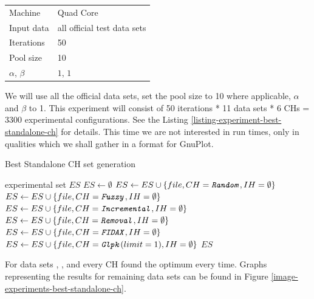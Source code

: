 \begin{center}
\bigskip
\begin{tabular}{| l | l |}
  \hline
  \hline
  Machine           & Quad Core \\
  Input data        & all official test data sets \\
  Iterations        & 50 \\
  Pool size         & 10 \\
  $\alpha$, $\beta$ & $1$, $1$ \\
  \hline
\end{tabular}
\bigskip
\end{center}

We will use all the official data sets, set the pool size to 10 where applicable, $\alpha$ and $\beta$ to 1. This experiment will consist of 50 iterations * 11 data sets * 6 CHs = 3300 experimental configurations. See the Listing \ref{listing-experiment-best-standalone-ch} for details. This time we are not interested in run times, only in qualities which we shall gather in a format for GnuPlot.

\begin{algorithm}
\caption{Best Standalone CH set generation}
\label{listing-experiment-best-standalone-ch}
\begin{algorithmic}
\ENSURE experimental set $ES$
\STATE $ES \gets \emptyset$
    	\STATE $ES \gets ES \cup \{file, CH = \texttt{\textit{Random}}, IH = \emptyset\}$
    	\STATE $ES \gets ES \cup \{file, CH = \texttt{\textit{Fuzzy}}, IH = \emptyset\}$
    	\STATE $ES \gets ES \cup \{file, CH = \texttt{\textit{Incremental}}, IH = \emptyset\}$
    	\STATE $ES \gets ES \cup \{file, CH = \texttt{\textit{Removal}}, IH = \emptyset\}$
    	\STATE $ES \gets ES \cup \{file, CH = \texttt{\textit{FIDAX}}, IH = \emptyset\}$
    	\STATE $ES \gets ES \cup \{file, CH = \texttt{\textit{Glpk}}(limit = 1), IH = \emptyset\}$
  \ENDFOR
\ENDFOR
\RETURN $ES$
\end{algorithmic}
\end{algorithm}

For data sets , ,  and  every CH found the optimum every time. Graphs representing the results for remaining data sets can be found in Figure \ref{image-experiments-best-standalone-ch}.

